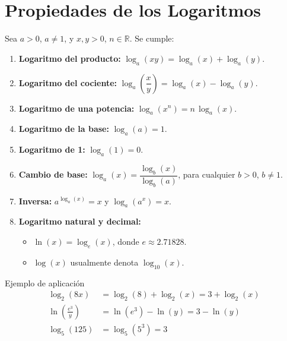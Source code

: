 \documentclass[12pt,a4paper]{article}
\begin{document}
\section{Propiedades de los Logaritmos}

Sea $a>0$, $a\neq 1$, y $x,y>0$, $n\in\mathbb{R}$. Se cumple:

\begin{tcolorbox}[colback=green!5, colframe=green!70!black, title=Propiedades Fundamentales]
\begin{enumerate}[label=\textbf{\arabic*.}]
    \item \textbf{Logaritmo del producto:} $\log_a(xy) = \log_a(x) + \log_a(y)$.
    \item \textbf{Logaritmo del cociente:} $\log_a\!\left(\dfrac{x}{y}\right) = \log_a(x) - \log_a(y)$.
    \item \textbf{Logaritmo de una potencia:} $\log_a(x^n) = n\,\log_a(x)$.
    \item \textbf{Logaritmo de la base:} $\log_a(a) = 1$.
    \item \textbf{Logaritmo de 1:} $\log_a(1)=0$.
    \item \textbf{Cambio de base:} $\log_a(x) = \dfrac{\log_b(x)}{\log_b(a)}$, para cualquier $b>0$, $b\neq 1$.
    \item \textbf{Inversa:} $a^{\log_a(x)} = x$ y $\log_a(a^x)=x$.
    \item \textbf{Logaritmo natural y decimal:}
    \begin{itemize}
        \item $\ln(x) = \log_e(x)$, donde $e\approx 2.71828$.
        \item $\log(x)$ usualmente denota $\log_{10}(x)$.
    \end{itemize}
\end{enumerate}
\end{tcolorbox}

\begin{funcbox}{Ejemplo de aplicación}
\begin{align*}
    \log_2(8x) &= \log_2(8) + \log_2(x) = 3 + \log_2(x) \\
    \ln\!\left(\frac{e^3}{y}\right) &= \ln(e^3) - \ln(y) = 3 - \ln(y) \\
    \log_5(125) &= \log_5(5^3) = 3
\end{align*}
\end{funcbox}

\end{document}
